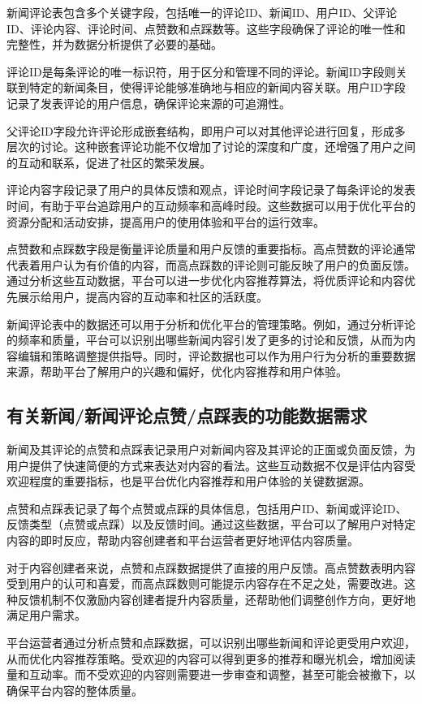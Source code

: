 新闻评论表包含多个关键字段，包括唯一的评论ID、新闻ID、用户ID、父评论ID、评论内容、评论时间、点赞数和点踩数等。这些字段确保了评论的唯一性和完整性，并为数据分析提供了必要的基础。

评论ID是每条评论的唯一标识符，用于区分和管理不同的评论。新闻ID字段则关联到特定的新闻条目，使得评论能够准确地与相应的新闻内容关联。用户ID字段记录了发表评论的用户信息，确保评论来源的可追溯性。

父评论ID字段允许评论形成嵌套结构，即用户可以对其他评论进行回复，形成多层次的讨论。这种嵌套评论功能不仅增加了讨论的深度和广度，还增强了用户之间的互动和联系，促进了社区的繁荣发展。

评论内容字段记录了用户的具体反馈和观点，评论时间字段记录了每条评论的发表时间，有助于平台追踪用户的互动频率和高峰时段。这些数据可以用于优化平台的资源分配和活动安排，提高用户的使用体验和平台的运行效率。

点赞数和点踩数字段是衡量评论质量和用户反馈的重要指标。高点赞数的评论通常代表着用户认为有价值的内容，而高点踩数的评论则可能反映了用户的负面反馈。通过分析这些互动数据，平台可以进一步优化内容推荐算法，将优质评论和内容优先展示给用户，提高内容的互动率和社区的活跃度。

新闻评论表中的数据还可以用于分析和优化平台的管理策略。例如，通过分析评论的频率和质量，平台可以识别出哪些新闻内容引发了更多的讨论和反馈，从而为内容编辑和策略调整提供指导。同时，评论数据也可以作为用户行为分析的重要数据来源，帮助平台了解用户的兴趣和偏好，优化内容推荐和用户体验。

\subsection{有关新闻/新闻评论点赞/点踩表的功能数据需求}

新闻及其评论的点赞和点踩表记录用户对新闻内容及其评论的正面或负面反馈，为用户提供了快速简便的方式来表达对内容的看法。这些互动数据不仅是评估内容受欢迎程度的重要指标，也是平台优化内容推荐和用户体验的关键数据源。

点赞和点踩表记录了每个点赞或点踩的具体信息，包括用户ID、新闻或评论ID、反馈类型（点赞或点踩）以及反馈时间。通过这些数据，平台可以了解用户对特定内容的即时反应，帮助内容创建者和平台运营者更好地评估内容质量。

对于内容创建者来说，点赞和点踩数据提供了直接的用户反馈。高点赞数表明内容受到用户的认可和喜爱，而高点踩数则可能提示内容存在不足之处，需要改进。这种反馈机制不仅激励内容创建者提升内容质量，还帮助他们调整创作方向，更好地满足用户需求。

平台运营者通过分析点赞和点踩数据，可以识别出哪些新闻和评论更受用户欢迎，从而优化内容推荐策略。受欢迎的内容可以得到更多的推荐和曝光机会，增加阅读量和互动率。而不受欢迎的内容则需要进一步审查和调整，甚至可能会被撤下，以确保平台内容的整体质量。

